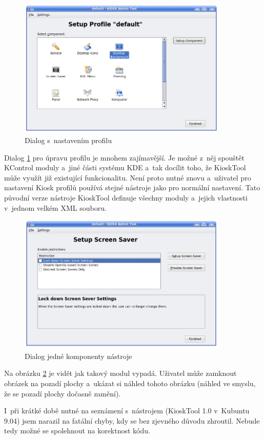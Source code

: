\begin{figure}[h]
    \centering
    \includegraphics[width=10cm]{obrazky/KioskToolKDE3/seznam_komponent.png}
    \caption{Dialog s~nastavením profilu}
    \label{fig:kt3_nast_prof}
\end{figure}
Dialog \ref{fig:kt3_nast_prof} pro úpravu profilu je mnohem zajímavější. Je možné z~něj spouštět KControl moduly a~jiné části systému KDE a~tak docílit toho, že KioskTool může využít již existující funkcionalitu. Není proto nutné znovu  a~uživatel pro nastavení Kiosk profilů používá stejné nástroje jako pro normální nastavení. Tato původní verze nástroje KioskTool definuje všechny moduly a~jejich vlastnosti v~jednom velkém XML souboru.

\begin{figure}[h]
    \centering
    \includegraphics[width=10cm]{obrazky/KioskToolKDE3/ukazka_komponenty.png}
    \caption{Dialog jedné komponenty nástroje}
    \label{fig:kt3_nast_komp}
\end{figure}
Na obrázku \ref{fig:kt3_nast_komp} je vidět jak takový modul vypadá. Uživatel může zamknout obrázek na pozadí plochy a~ukázat si náhled tohoto obrázku (náhled ve smyslu, že se pozadí plochy dočasně zamění).

I~při krátké době nutné na seznámení s~nástrojem (KioskTool 1.0 v~Kubuntu 9.04) jsem narazil na fatální chyby, kdy se bez zjevného důvodu zhroutil. Nebude tedy možné se spolehnout na korektnost kódu.

